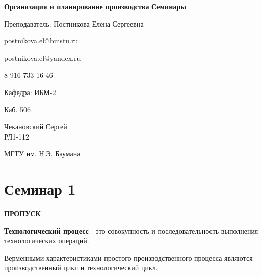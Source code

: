 \documentclass[14pt,a4paper,oneside]{extarticle}
\begin{document}


\begin{titlepage}
    \begin{center}
        \vspace*{1cm}

        \Huge
        \textbf{Организация и планирование производства}
        \textbf{Семинары}

        \vspace{0.5cm}
        \LARGE
        Преподаватель: Постникова Елена Сергеевна

        postnikova.el@bmstu.ru

        postnikova.el@yandex.ru

        8-916-733-16-46


        \vspace{1.5cm}

        Кафедра: ИБМ-2

        Каб. 506

        \vfill

        Чекановский Сергей\\
        РЛ1-112

        \vspace{0.8cm}


        \Large
        МГТУ им. Н.Э. Баумана

    \end{center}
\end{titlepage}

\tableofcontents

\clearpage

\section{Семинар 1}

\textbf{ПРОПУСК}



\textbf{Технологический процесс} - это совокупность и последовательность выполнения технологических операций.

Верменными характеристиками простого производственного процесса являются производственный цикл и технологический цикл.
\end{document}
